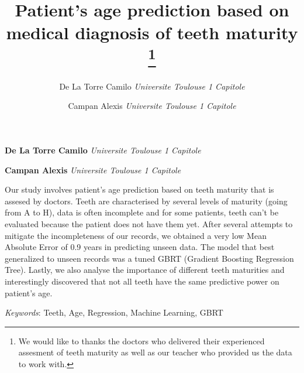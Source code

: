 \documentclass[11pt,]{article}
\title{Patient's age prediction based on medical diagnosis of teeth
maturity \thanks{We would like to thanks the doctors who delivered their
experienced assesment of teeth maturity as well as our teacher who
provided us the data to work with.}  }
\author{\Large De La Torre
Camilo\vspace{0.05in} \newline\normalsize\emph{Universite Toulouse 1
Capitole}   \and \Large Campan
Alexis\vspace{0.05in} \newline\normalsize\emph{Universite Toulouse 1
Capitole}  }
\date{}
\newcommand*{\authorfont}{\fontfamily{phv}\selectfont}
\renewenvironment{abstract}
 {{%
    \setlength{\leftmargin}{0mm}
    \setlength{\rightmargin}{\leftmargin}%
  }%
  \relax}
 {\endlist}
\begin{document}
	
%    


{%
\setlength{\parindent}{0pt}
\thispagestyle{plain}
{\fontsize{18}{20}\selectfont\raggedright 
\maketitle  %

}

{
   \vskip 13.5pt\relax \normalsize\fontsize{11}{12} 
\textbf{\authorfont De La Torre
Camilo} \hskip 15pt \emph{\small Universite Toulouse 1
Capitole}   \par \textbf{\authorfont Campan
Alexis} \hskip 15pt \emph{\small Universite Toulouse 1 Capitole}   

}

}








\begin{abstract}

    \hbox{\vrule height .2pt width 39.14pc}

    \vskip 8.5pt %

\noindent Our study involves patient's age prediction based on teeth
maturity that is assesed by doctors. Teeth are characterised by several
levels of maturity (going from A to H), data is often incomplete and for
some patients, teeth can't be evaluated because the patient does not
have them yet. After several attempts to mitigate the incompleteness of
our records, we obtained a very low Mean Absolute Error of 0.9 years in
predicting unseen data. The model that best generalized to unseen
records was a tuned GBRT (Gradient Boosting Regression Tree). Lastly, we
also analyse the importance of different teeth maturities and
interestingly discovered that not all teeth have the same predictive
power on patient's age.


\vskip 8.5pt \noindent \emph{Keywords}: Teeth, Age, Regression, Machine
Learning, GBRT \par

    \hbox{\vrule height .2pt width 39.14pc}



\end{abstract}
\end{document}
